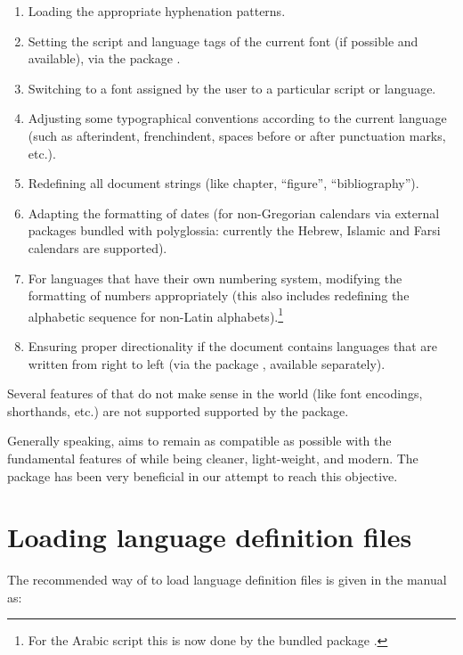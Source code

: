  \begin{enumerate}
 \item Loading the appropriate hyphenation patterns.
 \item Setting the script and language tags of the current font (if possible and
       available), via the package .
 \item Switching to a font assigned by the user to a particular script or language.
 \item Adjusting some typographical conventions according to the current language
       (such as afterindent, frenchindent, spaces before or after punctuation marks,
       etc.).
 \item Redefining all document strings (like chapter, ``figure'', ``bibliography'').
 \item Adapting the formatting of dates (for non-Gregorian calendars via external
       packages bundled with polyglossia: currently the Hebrew, Islamic and Farsi
       calendars are supported).
 \item For languages that have their own numbering system, modifying the formatting
       of numbers appropriately (this also includes redefining the alphabetic sequence
       for non-Latin alphabets).\footnote{ %
         For the Arabic script this is now done by the bundled package .}
 \item Ensuring proper directionality if the document contains languages
       that are written from right to left (via the package ,
       available separately).
 \end{enumerate}
 
 Several features of  that do not make sense in the \XeTeX\/\luatex world (like font
 encodings, shorthands, etc.) are not supported supported by the package.
 
 Generally speaking,  aims to remain as compatible as possible
 with the fundamental features of  while being cleaner, light-weight,
 and modern. The package  has been very beneficial in our attempt to
 reach this objective.


\section{Loading language definition files}

The recommended way of  to load language definition files
is given in the manual as:
 
